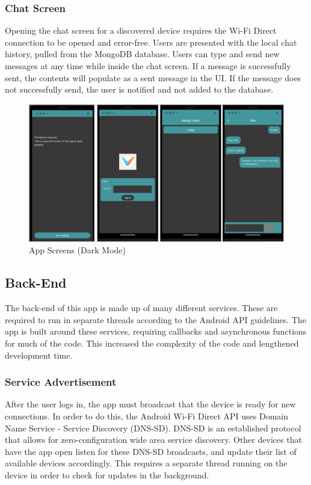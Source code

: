 \documentclass[10pt]{article}
\begin{document}
\subsubsection{Chat Screen}
Opening the chat screen for a discovered device requires the Wi-Fi Direct connection to be opened and error-free. Users are presented with the local chat history, pulled from the MongoDB database. Users can type and send new messages at any time while inside the chat screen. If a message is successfully sent, the contents will populate as a sent message in the UI. If the message does not successfully send, the user is notified and not added to the database.

\begin{figure}[h]
    \centering
    \includegraphics[width=6.5in]{screens.png}
    \caption{App Screens (Dark Mode)}
    \label{frontend:screens}
\end{figure}

\subsection{Back-End}
The back-end of this app is made up of many different services. These are required to run in separate threads according to the Android API guidelines. The app is built around these services, requiring callbacks and asynchronous functions for much of the code. This increased the complexity of the code and lengthened development time.
\subsubsection{Service Advertisement}
After the user logs in, the app must broadcast that the device is ready for new connections. In order to do this, the Android Wi-Fi Direct API uses Domain Name Service - Service Discovery (DNS-SD). DNS-SD is an established protocol that allows for zero-configuration wide area service discovery. Other devices that have the app open listen for these DNS-SD broadcasts, and update their list of available devices accordingly. This requires a separate thread running on the device in order to check for updates in the background.
\end{document}
